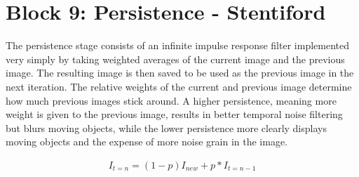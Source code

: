 
\section{Block 9: Persistence - Stentiford}

The persistence stage consists of an infinite impulse response filter 
implemented very simply by taking weighted averages of the current 
image and the previous image. The resulting image is then saved to be 
used as the previous image in the next iteration. The relative weights 
of the current and previous image determine how much previous images 
stick around. A higher persistence, meaning more weight is given to the 
previous image, results in better temporal noise filtering but blurs 
moving objects, while the lower persistence more clearly displays moving 
objects and the expense of more noise grain in the image.

\begin{align*}
    I_{t = n} = (1 - p)I_{new} + p*I_{t = n - 1}
\end{align*}